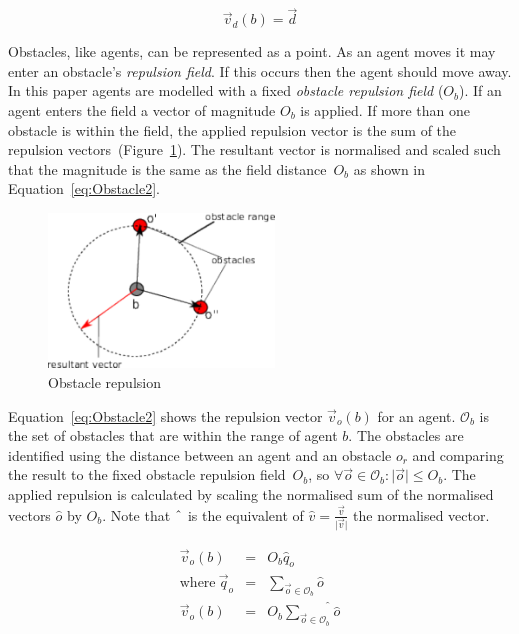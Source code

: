 \documentclass{ieeeaccess}
\newcommand{\magn}[1]{\vert{#1}\vert}
\begin{document}
\begin{equation}
\label{eq:Direction}
\vec v_d(b) = \vec d
\end{equation}

Obstacles, like agents, can be represented as a point. As an agent moves it may enter an obstacle's \textit{repulsion field}. If this occurs then the agent should move away. In this paper agents are modelled with a fixed \textit{obstacle repulsion field} ($O_b$). If an agent enters the field a vector of magnitude $O_b$ is applied. If more than one obstacle is within the field, the applied repulsion vector is the sum of the repulsion vectors~(Figure~\ref{fig:Obstacle1}). The resultant vector is normalised and scaled such that the magnitude is the same as the field distance~$O_b$ as shown in Equation~\ref{eq:Obstacle2}.

\begin{figure}[H]
\begin{center}
\includegraphics[width=6cm]{figures/Obstacle1}
\end{center}
\caption{Obstacle repulsion \label{fig:Obstacle1}}
\end{figure}

Equation~\ref{eq:Obstacle2} shows the repulsion vector $\vec v_o(b)$ for an agent.
$\mathcal O_b$ is the set of obstacles that are within the range of agent $b$.
The obstacles are identified using the distance between an agent and an
obstacle $o_r$ and comparing the result to the fixed obstacle repulsion
field~$O_b$, so $\forall \vec o \in \mathcal O_b : \magn{\vec o}\leq O_b$.
The applied repulsion is calculated by scaling the normalised sum of the
normalised vectors $\hat o$ by $O_b$.  Note that $\string^$ is the equivalent
of $\hat v = \frac{\vec v}{\magn{\vec v}}$ the normalised vector.


\begin{eqnarray}\label{eq:Obstacle2}
  \vec v_o(b) & = & O_b \hat q_o \\
	\mathrm{where~}  \vec q_o & = & \sum_{\vec o\in \mathcal O_b } \hat o
	\nonumber \\
	\vec v_o(b) & = & O_b \widehat{\sum_{\vec o\in \mathcal O_b }} \hat o \nonumber
\end{eqnarray}
\end{document}
